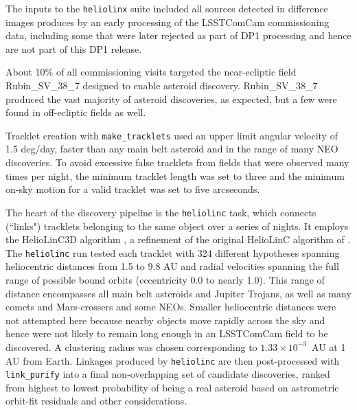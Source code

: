 The inputs to the {\tt heliolinx} suite included all sources detected in difference images produces by an early processing of the \gls{LSSTComCam} commissioning data,  including some that were later rejected as part of DP1 processing and hence are not part of this DP1 release.

About 10\% of all commissioning visits targeted the near-ecliptic field Rubin\_SV\_38\_7 designed to enable asteroid discovery.
Rubin\_SV\_38\_7 produced the vast majority of asteroid discoveries, as expected, but a few were found in off-ecliptic fields as well.

Tracklet creation with {\tt make\_tracklets} used an upper limit angular velocity of 1.5 \gls{deg}/day, faster than any main belt asteroid and in the range of many NEO discoveries.
To avoid excessive false tracklets from fields that were observed many times per night, the minimum \gls{tracklet} length was set to three and the minimum on-sky motion for a valid \gls{tracklet} was set to five arcseconds.

The heart of the discovery \gls{pipeline} is the {\tt heliolinc} task, which connects (``links") tracklets belonging to the same object over a series of nights.
It employs the HelioLinC3D algorithm \citep{2020DPS....5221101E,2022DPS....5450404H}, a refinement of the original HelioLinC algorithm of \citet{2018AJ....156..135H}.
The {\tt heliolinc} run tested each \gls{tracklet} with 324 different hypotheses spanning heliocentric distances from 1.5 to 9.8 AU and radial velocities spanning the full range of possible bound orbits (eccentricity 0.0 to nearly 1.0).
This range of distance encompasses all main belt asteroids and Jupiter Trojans, as well as many comets and Mars-crossers and some NEOs.
Smaller heliocentric distances were not attempted here because nearby objects move rapidly across the sky and hence were not likely to remain long enough in an \gls{LSSTComCam} field to be discovered.
A clustering radius was chosen corresponding to $1.33 \times 10^{-3}$~AU at 1 \gls{AU} from Earth. Linkages produced by {\tt heliolinc} are then post-processed with {\tt link\_purify} into a final non-overlapping set of candidate discoveries, ranked from highest to lowest probability of being a real asteroid based on astrometric orbit-fit residuals and other considerations.
